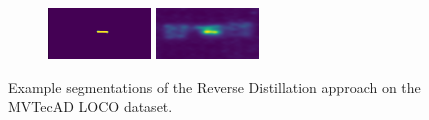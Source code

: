 \begin{figure}[H]
\begin{subfigure}[b]{\textwidth}
\begin{minipage}{0.45\textwidth}
            \includegraphics[width=0.3\textwidth]{figures/appendix/appendix_RevDist/SC/045_mask.png}
            \includegraphics[width=0.3\textwidth]{figures/appendix/appendix_RevDist/SC/045m.png}
        \end{minipage}
    \end{subfigure}


    \caption{Example segmentations of the Reverse Distillation \cite{revdist2023} approach on the MVTecAD LOCO \cite{LOCODentsAndScratchesBergmann2022} dataset.}
    \label{fig:appendixRevDist}
\end{figure}